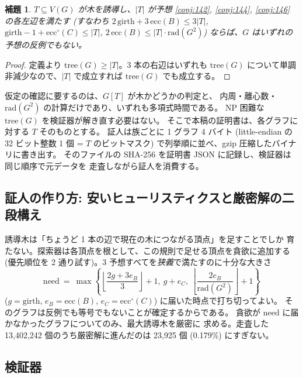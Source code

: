 \documentclass[paper=a4,fontsize=10.5pt,jafontsize=10.5pt]{jlreq}
\theoremstyle{plain}
\newtheorem{lemma}[theorem]{補題}
\theoremstyle{definition}
\begin{document}
\begin{lemma}\label{lem:witness}
$T \subseteq V(G)$ が木を誘導し、$|T|$ が予想 \ref{conj:142},
\ref{conj:144}, \ref{conj:146} の各左辺を満たす
(すなわち $2\,\mathrm{girth} + 3\,\mathrm{ecc}(B) \le 3|T|$,
$\mathrm{girth} - 1 + \mathrm{ecc}^{\circ}(C) \le |T|$,
$2\,\mathrm{ecc}(B) \le |T| \cdot \mathrm{rad}(G^2)$)
ならば、$G$ はいずれの予想の反例でもない。
\end{lemma}

\begin{proof}
定義より $\mathrm{tree}(G) \ge |T|$。3 本の右辺はいずれも
$\mathrm{tree}(G)$ について単調非減少なので、$|T|$ で成立すれば
$\mathrm{tree}(G)$ でも成立する。
\end{proof}

仮定の確認に要するのは、$G[T]$ が木かどうかの判定と、
内周・離心数・$\mathrm{rad}(G^2)$ の計算だけであり、いずれも多項式時間である。
NP 困難な $\mathrm{tree}(G)$ を検証器が解き直す必要はない。
そこで本稿の証明書は、各グラフに対する $T$ そのものとする。
証人は族ごとに 1 グラフ 4 バイト (little-endian の 32 ビット整数 1 個 =
$T$ のビットマスク) で列挙順に並べ、gzip 圧縮したバイナリに書き出す。
そのファイルの SHA-256 を証明書 JSON に記録し、検証器は同じ順序で元データを
走査しながら証人を消費する。

\subsection{証人の作り方: 安いヒューリスティクスと厳密解の二段構え}

誘導木は「ちょうど 1 本の辺で現在の木につながる頂点」を足すことでしか
育たない。探索器は各頂点を根として、この規則で足せる頂点を貪欲に追加する
(優先順位を 2 通り試す)。3 予想すべてを\emph{狭義}で満たすのに十分な大きさ
\[ \mathrm{need} \ = \ \max\left\{
   \left\lfloor \frac{2g + 3e_B}{3} \right\rfloor + 1, \
   g + e_C, \
   \left\lfloor \frac{2 e_B}{\mathrm{rad}(G^2)} \right\rfloor + 1 \right\} \]
($g = \mathrm{girth}$, $e_B = \mathrm{ecc}(B)$,
$e_C = \mathrm{ecc}^{\circ}(C)$) に届いた時点で打ち切ってよい。
そのグラフは反例でも等号でもないことが確定するからである。
貪欲が $\mathrm{need}$ に届かなかったグラフについてのみ、最大誘導木を厳密に
求める。走査した 13,402,242 個のうち厳密解に進んだのは 23,925 個
(0.179\%) にすぎない。

\subsection{検証器}
\end{document}
